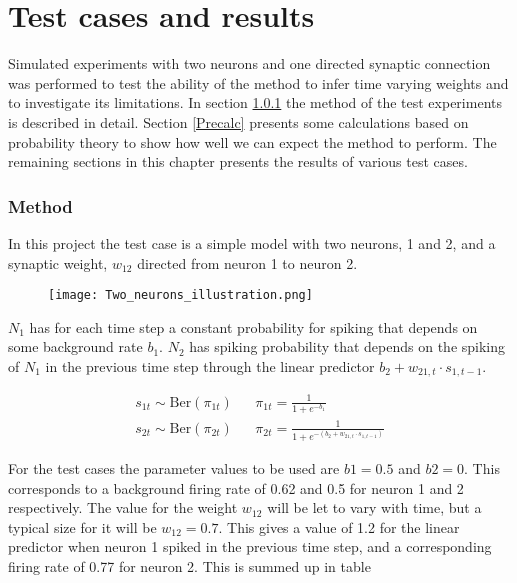 
\chapter{Test cases and results}

Simulated experiments with two neurons and one directed synaptic connection was performed to test the ability of the method to infer time varying weights and to investigate its limitations. In section \ref{Method} the method of the test experiments is described in detail. Section \ref{Precalc} presents some calculations based on probability theory to show how well we can expect the method to perform. The remaining sections in this chapter presents the results of various test cases.

\subsection{Method}
\label{Method}

In this project the test case is a simple model with two neurons, 1 and 2, and a synaptic weight, $w_{12}$ directed from neuron 1 to neuron 2.

\begin{figure}[h]
    \centering
    \texttt{[image: Two\_neurons\_illustration.png]}
\end{figure}

$N_1$ has for each time step a constant probability for spiking that depends on some background rate $b_1$. $N_2$ has spiking probability that depends on the spiking of $N_1$ in the previous time step through the linear predictor $b_2 + w_{21,t} \cdot s_{1,t-1}$. 

\begin{align*}
    s_{1t} \sim \text{Ber}(\pi_{1t}) && \pi_{1t}= \frac{1}{1+e^{-b_1}} \\
    s_{2t} \sim \text{Ber}(\pi_{2t}) && \pi_{2t}= \frac{1}{1+e^{-(b_2 + w_{21,t} \cdot s_{1,t-1})}}
\end{align*}

For the test cases the parameter values to be used are $b1 = 0.5$ and $b2 = 0$. This corresponds to a background firing rate of 0.62 and 0.5 for neuron 1 and 2 respectively. The value for the weight $w_{12}$ will be let to vary with time, but a typical size for it will be $w_{12}=0.7$. This gives a value of 1.2 for the linear predictor when neuron 1 spiked in the previous time step, and a corresponding firing rate of 0.77 for neuron 2. This is summed up in table 

